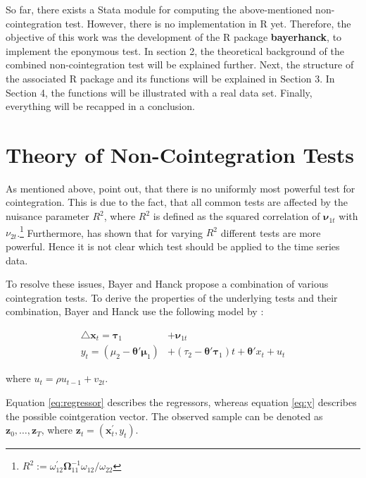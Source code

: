\documentclass[11pt,a4paper]{article}
\let\rmarkdownfootnote\footnote%
\def\footnote{\protect\rmarkdownfootnote}
\begin{document}
So far, there exists a Stata module for computing the above-mentioned
non-cointegration test. However, there is no implementation in R yet.
Therefore, the objective of this work was the development of the R
package \textbf{bayerhanck}, to implement the eponymous test. In section
2, the theoretical background of the combined non-cointegration test
will be explained further. Next, the structure of the associated R
package and its functions will be explained in Section 3. In Section 4,
the functions will be illustrated with a real data set. Finally,
everything will be recapped in a conclusion.

\hypertarget{theory-of-non-cointegration-tests}{%
\section{Theory of Non-Cointegration
Tests}\label{theory-of-non-cointegration-tests}}

As mentioned above, \textcite{Bayerhanck2009} point out, that there is
no uniformly most powerful test for cointegration. This is due to the
fact, that all common tests are affected by the nuisance parameter
\(R^2\), where \(R^2\) is defined as the squared correlation of
\(\pmb{\nu}_{1t}\) with \(\nu_{2t}\).\footnote{\(R^2:= \omega_{12}^{'} \pmb{\Omega}_{11}^{-1}\omega_{12} / \omega_{22}\)}
Furthermore, \textcite{pesavento2004} has shown that for varying \(R^2\)
different tests are more powerful. Hence it is not clear which test
should be applied to the time series data.

To resolve these issues, Bayer and Hanck propose a combination of
various cointegration tests. To derive the properties of the underlying
tests and their combination, Bayer and Hanck use the following model by
\textcite{pesavento2004}:

\begin{align}
\label{eq:regressor}
\triangle \pmb{x}_t = \pmb{\tau}_1 &+  \pmb{\nu}_{1t}\\
\label{eq:y}
y_t  = \left(\mu_2 - \pmb{\theta}' \pmb{\mu}_1 \right) &+ \left(\tau_2 - \pmb{\theta}' \pmb{\tau}_1 \right)t + \pmb{\theta}' x_t + u_t \nonumber
\end{align}

where \(u_t = \rho u_{t-1} + v_{2t}\).

Equation \eqref{eq:regressor} describes the regressors, whereas equation
\eqref{eq:y} describes the possible cointgeration vector. The observed
sample can be denoted as \(\pmb{z}_0, \ldots , \pmb{z}_T\), where
\(\pmb{z}_t = (\pmb{x}_t^{'}, y_t)\).
\end{document}
